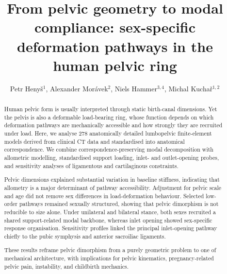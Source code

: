 \documentclass[openacc]{rsproca_new}
\begin{document}
\title{From pelvic geometry to modal compliance: sex-specific deformation pathways in the human pelvic ring}

\author{Petr Heny\v{s}$^{1}$, Alexander Mor\'{a}vek$^{2}$, Niels Hammer$^{3,4}$, Michal Kucha\v{r}$^{1,2}$}

\address{$^{1}$Institute of New Technologies and Applied Informatics, Faculty of Mechatronics, Informatics and Interdisciplinary Studies, Technical University of Liberec, Liberec, Czech Republic\\
$^{2}$Department of Anatomy, Faculty of Medicine in Hradec Kr\'{a}lov\'{e}, Charles University, Hradec Kr\'{a}lov\'{e}, Czech Republic\\
$^{3}$Division of Macroscopic and Clinical Anatomy, Gottfried Schatz Research Center, Medical University of Graz, Graz, Austria\\
$^{4}$Department of Orthopedic and Trauma Surgery, University of Leipzig, Leipzig, Germany; Division of Biomechatronics, Fraunhofer IWU, Dresden, Germany}

\subject{biomechanics, evolutionary anthropology, obstetrics}




\begin{abstract}

Human pelvic form is usually interpreted through static birth-canal dimensions. Yet the pelvis is also a deformable load-bearing ring, whose function depends on which deformation pathways are mechanically accessible and how strongly they are recruited under load. Here, we analyse 278 anatomically detailed lumbopelvic finite-element models derived from clinical CT data and standardised into anatomical correspondence. We combine correspondence-preserving modal decomposition with allometric modelling, standardised support loading, inlet- and outlet-opening probes, and sensitivity analyses of ligamentous and cartilaginous constraints.

Pelvic dimensions explained substantial variation in baseline stiffness, indicating that allometry is a major determinant of pathway accessibility. Adjustment for pelvic scale and age did not remove sex differences in load-deformation behaviour. Selected low-order pathways remained sexually structured, showing that pelvic dimorphism is not reducible to size alone. Under unilateral and bilateral stance, both sexes recruited a shared support-related modal backbone, whereas inlet opening showed sex-specific response organisation. Sensitivity profiles linked the principal inlet-opening pathway chiefly to the pubic symphysis and anterior sacroiliac ligaments.

These results reframe pelvic dimorphism from a purely geometric problem to one of mechanical architecture, with implications for pelvic kinematics, pregnancy-related pelvic pain, instability, and childbirth mechanics.


\end{abstract}
\end{document}

